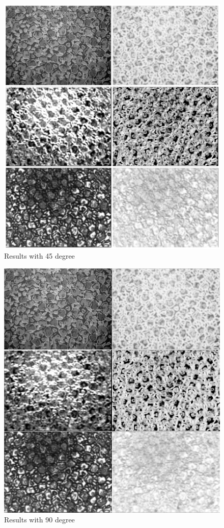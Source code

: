 \documentclass{article}
\begin{document}
\begin{figure}[H]
\begin{center}
\includegraphics[scale=0.35]{result2.jpeg}
\caption{Results with 45 degree}
\end{center}
\end{figure}	

\begin{figure}[H]
\begin{center}
\includegraphics[scale=0.35]{result3.jpeg}
\caption{Results with 90 degree}
\end{center}
\end{figure}	
\end{document}
